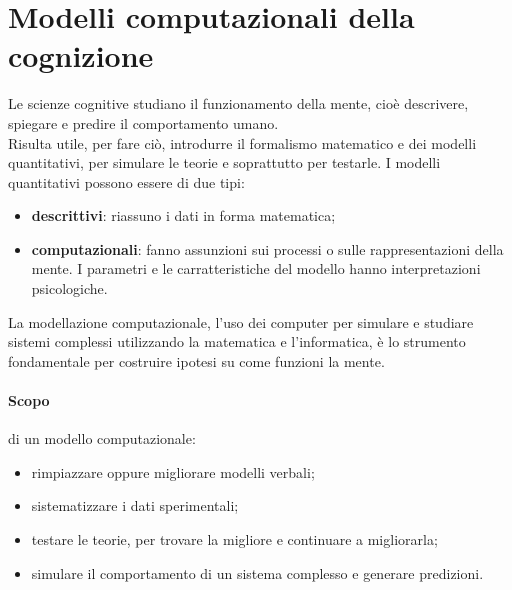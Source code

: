 \section{Modelli computazionali della cognizione}

Le scienze cognitive studiano il funzionamento della mente, cioè descrivere,
spiegare e predire il comportamento umano.\\
Risulta utile, per fare ciò, introdurre il formalismo matematico e dei modelli
quantitativi, per simulare le teorie e soprattutto per testarle.
I modelli quantitativi possono essere di due tipi:
\begin{itemize}
	\item \textbf{descrittivi}: riassuno i dati in forma matematica;

	\item \textbf{computazionali}: fanno assunzioni sui processi o sulle
	rappresentazioni della mente. I parametri e le carratteristiche del modello
	hanno interpretazioni psicologiche.
\end{itemize}

La modellazione computazionale, l'uso dei computer per simulare e studiare
sistemi complessi utilizzando la matematica e l'informatica, è lo strumento
fondamentale per costruire ipotesi su come funzioni la mente.

\paragraph{Scopo} di un modello computazionale:
\begin{itemize}
	\item rimpiazzare oppure migliorare modelli verbali;

	\item sistematizzare i dati sperimentali;

	\item testare le teorie, per trovare la migliore e continuare a migliorarla;

	\item simulare il comportamento di un sistema complesso e generare
		predizioni.
\end{itemize}

